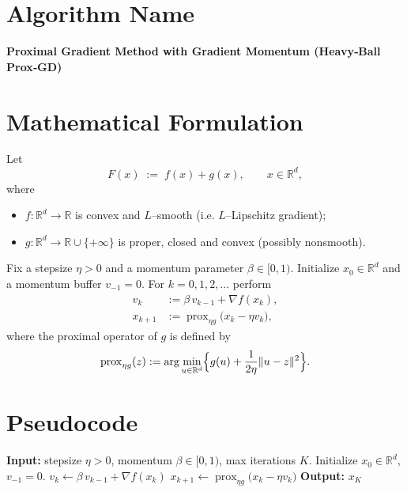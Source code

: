 \documentclass{article}
\newcommand{\prox}{\operatorname{prox}}
\newcommand{\R}{\mathbb{R}}
\begin{document}
\section*{Algorithm Name}
\textbf{Proximal Gradient Method with Gradient Momentum (Heavy‑Ball Prox‑GD)}

\section*{Mathematical Formulation}
Let 
\[
F(x)\;:=\;f(x)+g(x),\qquad x\in\R^{d},
\]
where  

\begin{itemize}[nosep]
\item $f:\R^{d}\rightarrow\R$ is convex and $L$–smooth (i.e. $L$–Lipschitz gradient);
\item $g:\R^{d}\rightarrow\R\cup\{+\infty\}$ is proper, closed and convex (possibly nonsmooth).
\end{itemize}
Fix a stepsize $\eta>0$ and a momentum parameter $\beta\in[0,1)$.  
Initialize $x_{0}\in\R^{d}$ and a momentum buffer $v_{-1}=0$.  
For $k=0,1,2,\dots$ perform
\[
\boxed{
\begin{aligned}
v_{k} &:= \beta\,v_{k-1}+ \nabla f(x_{k}),\\[4pt]
x_{k+1} &:= \prox_{\eta g}\!\bigl(x_{k}-\eta v_{k}\bigr),
\end{aligned}}
\tag{1}
\]
where the proximal operator of $g$ is defined by
\[
\prox_{\eta g}(z):=\arg\min_{u\in\R^{d}}\Bigl\{ g(u)+\frac{1}{2\eta}\|u-z\|^{2}\Bigr\}.
\]

\section*{Pseudocode}
\begin{algorithm}[H]
\caption{Heavy‑Ball Prox‑GD}
\begin{algorithmic}[1]
\STATE \textbf{Input:} stepsize $\eta>0$, momentum $\beta\in[0,1)$, max iterations $K$.
\STATE Initialize $x_{0}\in\R^{d}$, $v_{-1}=0$.
    \STATE $v_{k}\gets \beta\,v_{k-1}+ \nabla f(x_{k})$ \hfill{}
    \STATE $x_{k+1}\gets \prox_{\eta g}\!\bigl(x_{k}-\eta v_{k}\bigr)$
\ENDFOR
\STATE \textbf{Output:} $x_{K}$
\end{algorithmic}
\end{algorithm}
\end{document}
